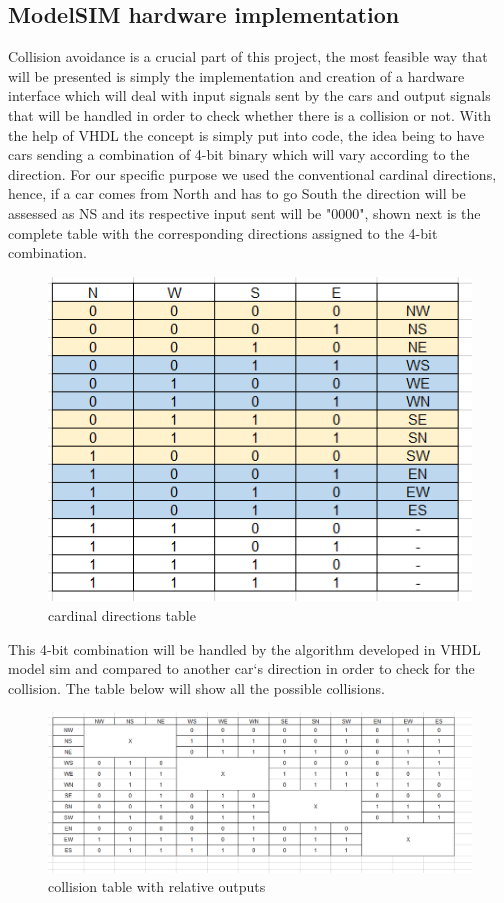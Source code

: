 \documentclass[conference]{IEEEtran}
\begin{document}
\subsection{ModelSIM hardware implementation}
Collision avoidance is a crucial part of this project, the most feasible way that will be presented is simply the implementation and creation of a hardware interface which will deal with input signals sent by the cars and output signals that will be handled in order to check whether there is a collision or not. With the help of VHDL the concept is simply put into code, the idea being to have cars sending a combination of 4-bit binary which will vary according to the direction. For our specific purpose we used the conventional cardinal directions, hence, if a car comes from North and has to go South the direction will be assessed as NS and its respective input sent will be "0000", shown next is the complete table with the corresponding directions assigned to the 4-bit combination.
\begin{figure}[h]
    \centerline{\includegraphics[scale=0.5]{directions table.png}}
    \caption{cardinal directions table}
    \label{directions}
\end{figure}


 This 4-bit combination will be handled by the algorithm developed in VHDL model sim and compared to another car`s direction in order to check for the collision. The table below will show all the possible collisions.

\begin{figure}[h]
    \centerline{\includegraphics[scale=0.25]{collision table.png}}
    \caption{collision table with relative outputs}
    \label{table}
\end{figure}
\end{document}
